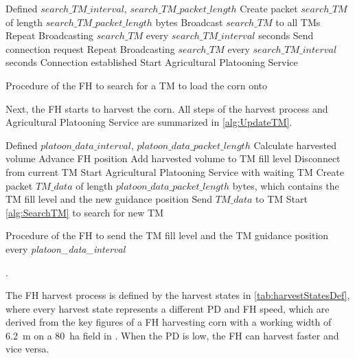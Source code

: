 \begin{algorithm}
\begin{algorithmic}[1]
\REQUIRE Defined $search\_TM\_interval$, $search\_TM\_packet\_length$
\STATE Create packet $search\_TM$ of length $search\_TM\_packet\_length$ bytes
\STATE Broadcast $search\_TM$ to all \acs{TM}s
    \STATE Repeat Broadcasting $search\_TM$ every $search\_TM\_interval$ seconds
\ELSE
   \STATE Send connection request
      \STATE Repeat Broadcasting $search\_TM$ every $search\_TM\_interval$ seconds
   \ELSE
      \STATE Connection established
      \STATE Start Agricultural Platooning Service
   \ENDIF
\ENDIF
\end{algorithmic}
\caption{Procedure of the \acf{FH} to search for a \acf{TM} to load the corn onto}
\label{alg:SearchTM}
\end{algorithm}

Next, the \ac{FH} starts to harvest the corn.
All steps of the harvest process and Agricultural Platooning Service are summarized in
\autoref{alg:UpdateTM}.

\begin{algorithm}
\begin{algorithmic}[1]
\REQUIRE Defined $platoon\_data\_interval$, $platoon\_data\_packet\_length$
\STATE Calculate harvested volume
\STATE Advance \ac{FH} position
\STATE Add harvested volume to \ac{TM} fill level
    \STATE Disconnect from current \ac{TM}
	\STATE Start Agricultural Platooning Service with waiting \ac{TM}
\ELSE
	\STATE Create packet $TM\_data$ of length $platoon\_data\_packet\_length$ bytes, which contains the \ac{TM} fill level and the new guidance position
	\STATE Send $TM\_data$ to \ac{TM}
		\STATE Start \autoref{alg:SearchTM} to search for new \ac{TM}
	\ENDIF
\ENDIF
\end{algorithmic}
\caption{Procedure of the \acf{FH} to send the \acf{TM} fill level and the \ac{TM} guidance position every
\textit{platoon\_data\_interval}}.
\label{alg:UpdateTM}
\end{algorithm}

The FH harvest process is defined by the harvest states in \autoref{tab:harvestStatesDef},
where every harvest state represents a different \ac{PD} and \ac{FH} speed, which are derived from the key figures of a
\ac{FH} harvesting corn with a working width of \SI{6.2}{\meter} on a \SI{80}{\hectare} field in \cite{faustzahlen2018}.
When the \ac{PD} is low, the \ac{FH} can harvest faster and vice versa.

